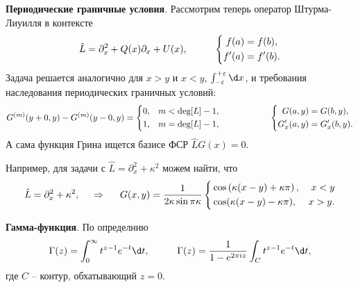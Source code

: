 \textbf{Периодические граничные условия}. Рассмотрим теперь оператор Штурма-Лиуилля  в контексте
\begin{equation*}
    \hat{L} = \partial_x^2 + Q(x) \partial_x + U(x), 
    \hspace{10 mm} 
    \left\{\begin{aligned}
        f(a) &= f(b), \\
        f'(a) &= f'(b).
    \end{aligned}\right.
\end{equation*}
Задача решается аналогично для $x > y$ и $x < y$, $\int_{-\varepsilon}^{+\varepsilon} \d x$, и требования наследования периодических граничных условий:
\begin{equation*}
    G^{(m)}(y+0, y)-G^{(m)}(y-0, y)  = \left\{\begin{aligned}
        &0, &m < \deg[L]-1, \\
        &1, &m = \deg[L]-1,
    \end{aligned}\right.
    \hspace{20 mm} 
    \left\{\begin{aligned}
        G(a, y) &= G(b, y), \\
        G_x'(a, y) &= G_x'(b, y).
    \end{aligned}\right.
\end{equation*}
А сама функция Грина ищется базисе ФСР $\hat{L} G(x) = 0$.

Например, для задачи с $\hat{L} = \partial_x^2 + \kappa^2$ можем найти, что
\begin{equation*}
    \hat{L} = \partial_x^2 + \kappa^2,
    \hspace{0.5cm} \Rightarrow \hspace{0.5cm}
     G(x, y) = \frac{1}{2 \kappa \sin \pi \kappa}
    \left\{\begin{aligned}
        &\cos \left(\kappa(x-y) + \kappa \pi\right), & x < y\\
        &\cos(\kappa (x-y) - \kappa \pi), & x > y.
    \end{aligned}\right.
\end{equation*}


\textbf{Гамма-функция}. По определнию
\begin{equation*}
    \Gamma(z) = \int_{0}^{\infty} t^{z-1} e^{-t} \d t,
    \hspace{10 mm} 
    \Gamma(z) = \frac{1}{1-e^{2 \pi i z}} \int_C t^{z-1} e^{-t} \d t,
\end{equation*}
где $C$ -- контур, обхатывающий $z = 0$. 

